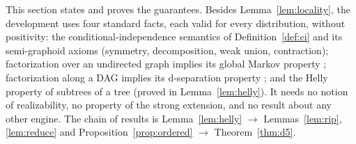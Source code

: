 \documentclass{article} %
\begin{document}
This section states and proves the guarantees. Besides
Lemma~\ref{lem:locality}, the development uses four standard facts, each valid
for every distribution, without positivity: the conditional-independence
semantics of Definition~\ref{def:ci} and its semi-graphoid axioms (symmetry,
decomposition, weak union, contraction); factorization over an undirected graph
implies its global Markov property \citep[Prop.~3.8]{lauritzen96}; factorization
along a DAG implies its d-separation property \citep[Thm.~3.27]{lauritzen96};
and the Helly property of subtrees of a tree (proved in Lemma~\ref{lem:helly}). It
needs no notion of realizability, no property of the strong extension, and no
result about any other engine. The chain of results is
Lemma~\ref{lem:helly} $\to$ Lemmas~\ref{lem:rip}, \ref{lem:reduce} and
Proposition~\ref{prop:ordered} $\to$ Theorem~\ref{thm:d5}.
\end{document}
